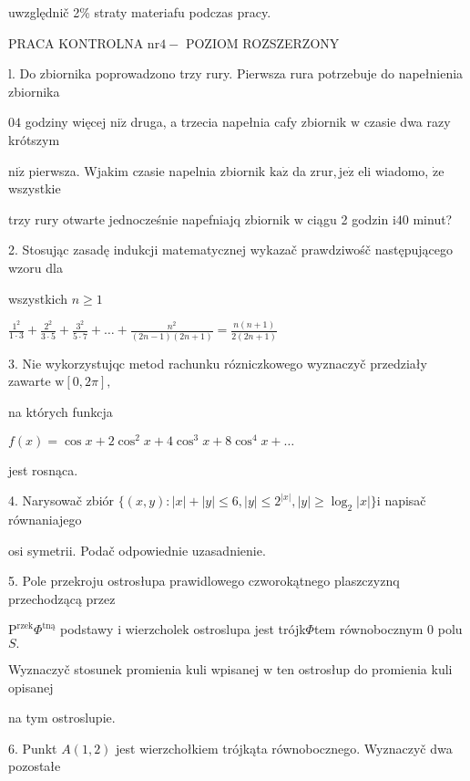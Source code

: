 \documentclass[a4paper,12pt]{article}
\begin{document}
uwzględnič 2\% straty materiafu podczas pracy.





PRACA KONTROLNA $\mathrm{n}\mathrm{r}4-$ POZIOM ROZSZERZONY

l. Do zbiornika poprowadzono trzy rury. Pierwsza rura potrzebuje do napełnienia zbiornika

$04$ godziny więcej $\mathrm{n}\mathrm{i}\dot{\mathrm{z}}$ druga, a trzecia napełnia cafy zbiornik $\mathrm{w}$ czasie dwa razy krótszym

$\mathrm{n}\mathrm{i}\dot{\mathrm{z}}$ pierwsza. Wjakim czasie napelnia zbiornik $\mathrm{k}\mathrm{a}\dot{\mathrm{z}}$ da $\mathrm{z}\mathrm{r}\mathrm{u}\mathrm{r}, \mathrm{j}\mathrm{e}\dot{\mathrm{z}}$ eli wiadomo, $\dot{\mathrm{z}}\mathrm{e}$ wszystkie

trzy rury otwarte jednocześnie napefniajq zbiornik $\mathrm{w}$ ciągu 2 godzin $\mathrm{i}40$ minut?

2. Stosując zasadę indukcji matematycznej wykazač prawdziwośč następującego wzoru dla

wszystkich $n\geq 1$

$\displaystyle \frac{1^{2}}{1\cdot 3}+\frac{2^{2}}{3\cdot 5}+\frac{3^{2}}{5\cdot 7}+\ldots+\frac{n^{2}}{(2n-1)(2n+1)}=\frac{n(n+1)}{2(2n+1)}$

3. Nie wykorzystujqc metod rachunku rózniczkowego wyznaczyč przedziały zawarte $\mathrm{w}[0,2\pi],$

na których funkcja

$ f(x)=\cos x+2\cos^{2}x+4\cos^{3}x+8\cos^{4}x+\ldots$

jest rosnąca.

4. Narysowač zbiór $\{(x,y):|x|+|y|\leq 6,|y|\leq 2^{|x|},|y|\geq\log_{2}|x|\}\mathrm{i}$ napisač równaniajego

osi symetrii. Podač odpowiednie uzasadnienie.

5. Pole przekroju ostrosłupa prawidlowego czworokątnego plaszczyznq przechodzącą przez

$\mathrm{P}^{\mathrm{r}\mathrm{z}\mathrm{e}\mathrm{k}}\Phi^{\mathrm{t}\mathrm{n}\text{ą}}$ podstawy $\mathrm{i}$ wierzcholek ostroslupa jest trójk$\Phi$tem równobocznym $0$ polu $S.$

Wyznaczyč stosunek promienia kuli wpisanej $\mathrm{w}$ ten ostrosłup do promienia kuli opisanej

na tym ostroslupie.

6. Punkt $A(1,2)$ jest wierzchołkiem trójkąta równobocznego. Wyznaczyč dwa pozostałe
\end{document}
